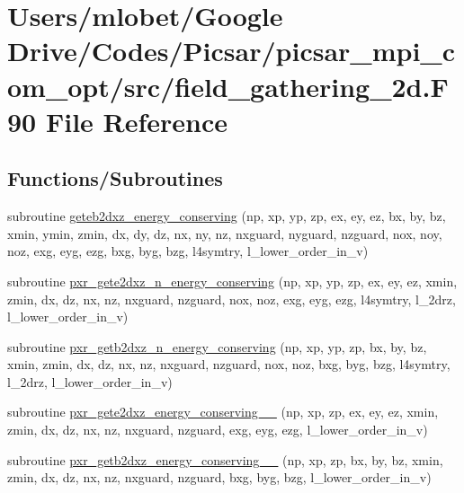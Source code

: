 \hypertarget{field__gathering__2d_8_f90}{}\section{Users/mlobet/\+Google Drive/\+Codes/\+Picsar/picsar\+\_\+mpi\+\_\+com\+\_\+opt/src/field\+\_\+gathering\+\_\+2d.F90 File Reference}
\label{field__gathering__2d_8_f90}
\subsection*{Functions/\+Subroutines}
\begin{DoxyCompactItemize}
\item 
subroutine \hyperlink{field__gathering__2d_8_f90_a6d4781dd6cacd0867443a1d9ff142ad7}{geteb2dxz\+\_\+energy\+\_\+conserving} (np, xp, yp, zp, ex, ey, ez, bx, by, bz, xmin, ymin, zmin, dx, dy, dz, nx, ny, nz, nxguard, nyguard, nzguard,                                                                                                                                                       nox, noy, noz, exg, eyg, ezg, bxg, byg, bzg, l4symtry, l\+\_\+lower\+\_\+order\+\_\+in\+\_\+v)
\item 
subroutine \hyperlink{field__gathering__2d_8_f90_ab93a0f4d8c25f1ff4ec81319daea39e2}{pxr\+\_\+gete2dxz\+\_\+n\+\_\+energy\+\_\+conserving} (np, xp, yp, zp, ex, ey, ez, xmin, zmin, dx, dz, nx, nz, nxguard, nzguard,                                                                                                                                                       nox, noz, exg, eyg, ezg, l4symtry, l\+\_\+2drz, l\+\_\+lower\+\_\+order\+\_\+in\+\_\+v)
\item 
subroutine \hyperlink{field__gathering__2d_8_f90_aa70004798c24521d5eb8c929aa0d556b}{pxr\+\_\+getb2dxz\+\_\+n\+\_\+energy\+\_\+conserving} (np, xp, yp, zp, bx, by, bz, xmin, zmin, dx, dz, nx, nz, nxguard, nzguard,                                                                                                                                                       nox, noz, bxg, byg, bzg, l4symtry, l\+\_\+2drz, l\+\_\+lower\+\_\+order\+\_\+in\+\_\+v)
\item 
subroutine \hyperlink{field__gathering__2d_8_f90_ac842cd53f1a2f6a52d1374176622815a}{pxr\+\_\+gete2dxz\+\_\+energy\+\_\+conserving\+\_\+\_} (np, xp, zp, ex, ey, ez, xmin, zmin, dx, dz, nx, nz,                                                                                                           nxguard, nzguard, exg, eyg, ezg, l\+\_\+lower\+\_\+order\+\_\+in\+\_\+v)
\item 
subroutine \hyperlink{field__gathering__2d_8_f90_a2717b1bd0676de944fad842e8169a3a9}{pxr\+\_\+getb2dxz\+\_\+energy\+\_\+conserving\+\_\+\_} (np, xp, zp, bx, by, bz, xmin, zmin, dx, dz, nx, nz,                                                                       nxguard, nzguard, bxg, byg, bzg, l\+\_\+lower\+\_\+order\+\_\+in\+\_\+v)
\end{DoxyCompactItemize}


